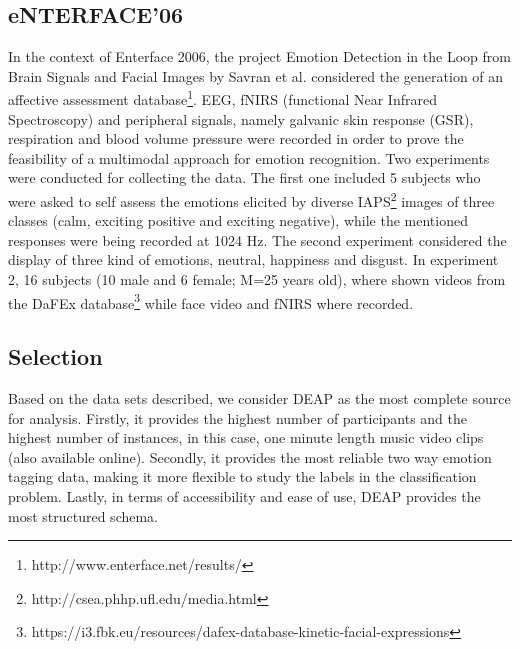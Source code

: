 \documentclass{sig-alternate}
\begin{document}
\subsection{eNTERFACE'06}
In the context of Enterface 2006, the project Emotion Detection
 in the Loop from Brain Signals and Facial Images by Savran 
 et al. \cite{savran12006emotiondetection} considered the 
 generation of an affective assessment 
 database\footnote{http://www.enterface.net/results/}. 
 EEG, fNIRS (functional Near Infrared Spectroscopy) and peripheral 
 signals, namely galvanic skin response (GSR), respiration and blood 
 volume pressure were recorded in order to prove the feasibility of 
 a multimodal approach for emotion recognition. Two experiments 
 were conducted for collecting the data. The first one included 5 subjects 
 who were asked to self assess the emotions elicited by diverse 
 IAPS\footnote{http://csea.phhp.ufl.edu/media.html} images of 
 three classes (calm, exciting positive and exciting negative), while 
 the mentioned responses were being recorded at 1024 Hz. The 
 second experiment considered the display of three kind of 
 emotions, neutral, happiness and disgust. In experiment 2, 16 
 subjects (10 male and 6 female; M=25 years old), where shown 
 videos from the DaFEx 
 database\footnote{https://i3.fbk.eu/resources/dafex-database-kinetic-facial-expressions} while face video and fNIRS where recorded.

\subsection{Selection}

Based on the data sets described, we consider DEAP as the most
complete source for analysis. Firstly, it provides the highest number of
participants and the highest number of instances, in this case, one minute
length music video clips (also available online). Secondly, it provides the
 most reliable two way emotion tagging data, making it more flexible to 
 study the labels in the classification problem. Lastly, in terms of accessibility
 and ease of use,  DEAP provides the most structured schema.
 
\end{document}
